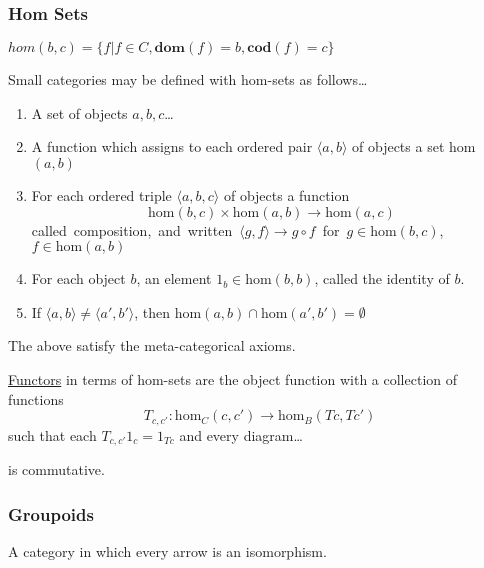 \subsubsection{Hom Sets}\label{homset}
$hom(b,c) = \{f | f \in C, \textbf{dom}(f) = b, \textbf{cod}(f) = c \}$

\label{homsetcategories}

Small categories may be defined with hom-sets as follows\dots
\begin{enumerate}
  \item A set of objects $a,b,c$\dots
  \item A function which assigns to each ordered pair $\langle a, b \rangle$ of objects a set hom$(a,b)$
  \item For each ordered triple $\langle a,b,c \rangle$ of objects a function
  			$$\textrm{hom}(b,c)\times\textrm{hom}(a,b) \rightarrow \textrm{hom}(a,c)$$
  		\mbox{called composition, and written $\langle g,f \rangle \rightarrow g \circ f$ for $g \in \textrm{hom}(b,c)$, $f \in \textrm{hom}(a,b)$}
  \item For each object $b$, an element $1_b \in \textrm{hom}(b,b)$, called the identity of $b$.
  \item If $\langle a,b \rangle \neq \langle a',b' \rangle$, then $\textrm{hom}(a,b) \cap \textrm{hom}(a',b') = \emptyset$
\end{enumerate}

\noindent The above satisfy the meta-categorical axioms.\newline

\hyperref[functor]{Functors} in terms of hom-sets are the object function with a collection of functions\label{homfunctors}
$$T_{c,c'}:\textrm{hom}_C(c,c') \rightarrow \textrm{hom}_B(Tc,Tc')$$
such that each $T_{c,c'}1_c = 1_{Tc}$ and every diagram\dots

\begin{figure}[H]
  \centering
  
\end{figure}

\noindent is commutative.

\subsubsection{Groupoids}\label{groupoid}
A category in which every arrow is an isomorphism.